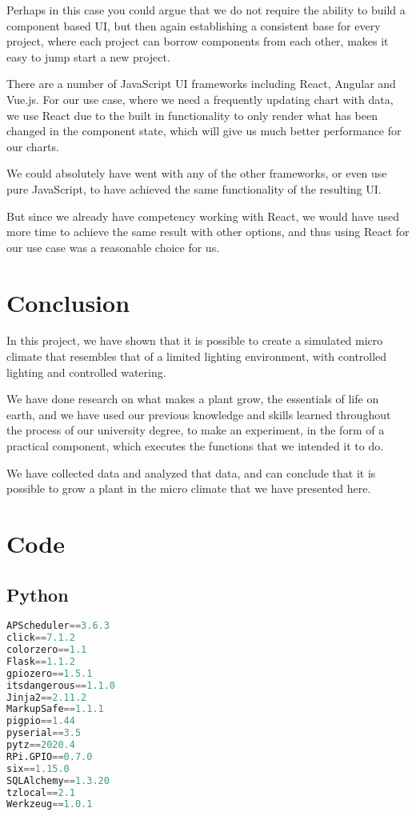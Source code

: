 \documentclass[12pt,a4paper,oneside]{book}
\begin{document}
Perhaps in this case you could argue that we do not require the ability to build a component based UI, but then again establishing a consistent base for every project, where each project can borrow components from each other, makes it easy to jump start a new project.

There are a number of JavaScript UI frameworks including React, Angular and Vue.js.
For our use case, where we need a frequently updating chart with data, we use React due to the built in functionality to only render what has been changed in the component state, which will give us much better performance for our charts.

We could absolutely have went with any of the other frameworks, or even use pure JavaScript, to have achieved the same functionality of the resulting UI.

But since we already have competency working with React, we would have used more time to achieve the same result with other options, and thus using React for our use case was a reasonable choice for us.

\chapter{Conclusion}
In this project, we have shown that it is possible to create a simulated micro climate that resembles that of a limited lighting environment, with controlled lighting and controlled watering.

We have done research on what makes a plant grow, the essentials of life on earth, and we have used our previous knowledge and skills learned throughout the process of our university degree, to make an experiment, in the form of a practical component, which executes the functions that we intended it to do.

We have collected data and analyzed that data, and can conclude that it is possible to grow a plant in the micro climate that we have presented here.


\appendix
\cleardoublepage{}
\chapter{Code}

\section{Python}
\begin{lstlisting}[title={raspberrypi/api/requirements.py}, language=Python]
APScheduler==3.6.3
click==7.1.2
colorzero==1.1
Flask==1.1.2
gpiozero==1.5.1
itsdangerous==1.1.0
Jinja2==2.11.2
MarkupSafe==1.1.1
pigpio==1.44
pyserial==3.5
pytz==2020.4
RPi.GPIO==0.7.0
six==1.15.0
SQLAlchemy==1.3.20
tzlocal==2.1
Werkzeug==1.0.1
\end{lstlisting}
\end{document}
